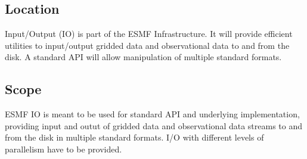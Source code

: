 \subsection{Location}

Input/Output (IO) is part of the ESMF Infrastructure.  It will provide
efficient utilities to input/output gridded data and observational data
to and from the disk. A standard API will allow manipulation of multiple
standard formats.


\subsection{Scope}

ESMF IO is meant to be used for standard API and underlying implementation, 
providing input and outut of gridded data and observational data streams to 
and from the disk in multiple standard formats. I/O with different levels of 
parallelism have to be provided.  


















